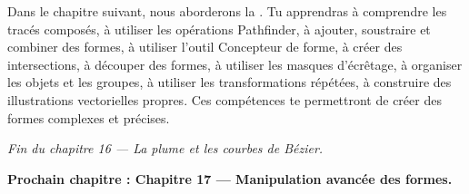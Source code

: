 Dans le chapitre suivant, nous aborderons la . Tu apprendras à comprendre les tracés composés, à utiliser les opérations Pathfinder, à ajouter, soustraire et combiner des formes, à utiliser l'outil Concepteur de forme, à créer des intersections, à découper des formes, à utiliser les masques d'écrêtage, à organiser les objets et les groupes, à utiliser les transformations répétées, à construire des illustrations vectorielles propres. Ces compétences te permettront de créer des formes complexes et précises.

\vspace{2em}

\begin{center}
\textit{Fin du chapitre 16 --- La plume et les courbes de Bézier.}

\vspace{1em}

\textbf{Prochain chapitre : Chapitre 17 --- Manipulation avancée des formes.}
\end{center}